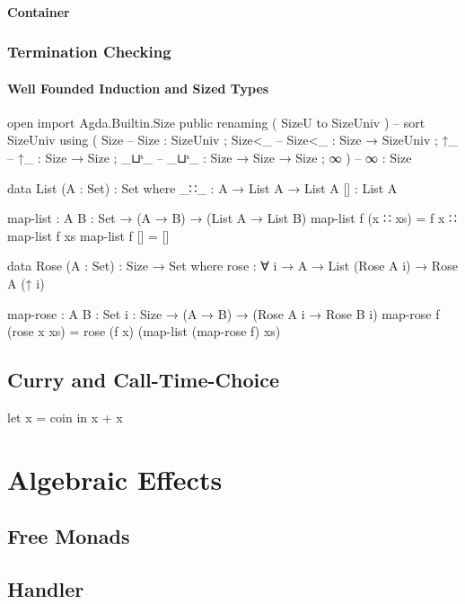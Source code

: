 \documentclass[10pt,a4paper,twoside]{report}
\begin{document}
\subsubsection{Container}

\subsection{Termination Checking}

\subsubsection{Well Founded Induction and Sized Types}

\begin{code}
open import Agda.Builtin.Size public
  renaming ( SizeU to SizeUniv )  --  sort SizeUniv
  using    ( Size                 --  Size   : SizeUniv
           ; Size<_               --  Size<_ : Size → SizeUniv
           ; ↑_                   --  ↑_     : Size → Size
           ; _⊔ˢ_                 --  _⊔ˢ_   : Size → Size → Size
           ; ∞ )                  --  ∞      : Size

data List (A : Set) : Set where
  _∷_  : A → List A → List A
  []   : List A

map-list : {A B : Set} → (A → B) → (List A → List B)
map-list f (x ∷ xs)  = f x ∷ map-list f xs
map-list f []        = []

data Rose (A : Set) : Size → Set where
  rose : ∀ {i} → A → List (Rose A i) → Rose A (↑ i)

map-rose : {A B : Set} {i : Size} → (A → B) → (Rose A i → Rose B i)
map-rose f (rose x xs) = rose (f x) (map-list (map-rose f) xs)
\end{code}

\section{Curry and Call-Time-Choice}
let x = coin in x + x

\chapter{Algebraic Effects}
\section{Free Monads}

\section{Handler}
\end{document}

